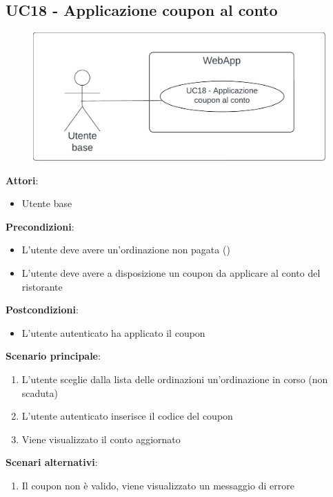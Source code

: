\subsection{UC18 - Applicazione coupon al conto} \label{usecase:18}
\begin{figure}[H]
    \centering
    \includegraphics[width=0.9\linewidth]{ucd/ucd18.png}
\end{figure}
\textbf{Attori}:
\begin{itemize}
    \item Utente base
\end{itemize}
\textbf{Precondizioni}:
\begin{itemize}
    \item L'utente deve avere un'ordinazione non pagata ()
    \item L'utente deve avere a disposizione un coupon da applicare al conto del ristorante
\end{itemize}
\textbf{Postcondizioni}:
\begin{itemize}
    \item L'utente autenticato ha applicato il coupon
\end{itemize}
\textbf{Scenario principale}:
\begin{enumerate}
    \item L'utente sceglie dalla lista delle ordinazioni un'ordinazione in corso (non scaduta)
    \item L'utente autenticato inserisce il codice del coupon
    \item Viene visualizzato il conto aggiornato
\end{enumerate}
\textbf{Scenari alternativi}:
\begin{enumerate}
    \item Il coupon non è valido, viene visualizzato un messaggio di errore
\end{enumerate}
\newpage